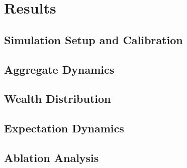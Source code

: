 
\chapter{Results}
\label{chap:results}


\section{Simulation Setup and Calibration}
\label{sec:sim_setup}


\section{Aggregate Dynamics}
\label{sec:aggregate_dynamics}


\section{Wealth Distribution}
\label{sec:wealth_distribution}


\section{Expectation Dynamics}
\label{sec:expectation_dynamics}


\section{Ablation Analysis}
\label{sec:ablation}


\endinput
